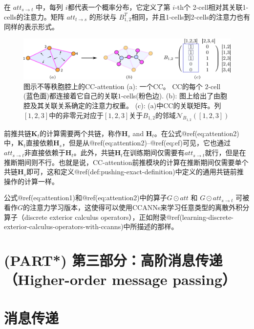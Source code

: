 \documentclass[
  12pt,
]{krantz}
\begin{document}
在 \(att_{s\to t}\) 中，每列 \(i\)都代表一个概率分布，它定义了第
\(i\)-th个 2-cell相对其关联1-cells的注意力。矩阵 \(att_{t\to s}\)
的形状与
\(B_{1,2}^T\)相同，并且1-cells到2-cells的注意力也有同样的表示形式。

\begin{figure}

{\centering \includegraphics{figures/B12} 

}

\caption{图示不等秩胞腔上的CC-attention (a): 一个CC。 CC的每个 $2$-cell (蓝色面)都连接着它自己的关联$1$-cells(粉色边). (b): 图上给出了由胞腔及其关联关系确定的注意力权重。 (c): (a)中CC的关联矩阵。列$[1,2,3]$中的非零元对应于$[1,2,3]$关于$B_{1,2}$的邻域$\mathcal{N}_{B_{1,2}}([1,2,3])$}\label{fig:B12}
\end{figure}

前推共链\(\mathbf{K}_t\)的计算需要两个共链，称作\(\mathbf{H}_s\) and
\(\mathbf{H}_t\)。在公式@ref(eq:attention2)中，\(\mathbf{K}_t\)直接依赖\(\mathbf{H}_s\)，但是从@ref(eq:attention2)--@ref(eq:ef)可见，它也通过\(att_{s\to t}\)非直接依赖于\(\mathbf{H}_t\)。此外，共链\(\mathbf{H}_t\)在训练期间仅需要有\(att_{s\to t}\)就行，但是在推断期间则不行。也就是说，CC-attention前推模块的计算在推断期间仅需要单个共链\(\mathbf{H}_s\)即可，这和定义@ref(def:pushing-exact-definition)中定义的通用共链前推操作的计算一样。

公式@ref(eq:attention1)和@ref(eq:attention2)中的算子\(G \odot att\) 和
\(G \odot att_{s\to t}\)
可被看作\(G\)的注意力学习版本，这使得可以使用CCANNs来学习任意类型的离散外积分算子（discrete
exterior calculus
operators），正如附录@ref(learning-discrete-exterior-calculus-operators-with-ccanns)中所描述的那样。

\section*{(PART*) 第三部分：高阶消息传递（Higher-order message
passing）}\label{part-ux7b2cux4e09ux90e8ux5206ux9ad8ux9636ux6d88ux606fux4f20ux9012higher-order-message-passing}

\section{消息传递}\label{message-passing}
\end{document}
